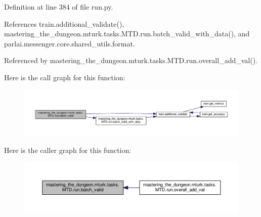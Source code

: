Definition at line 384 of file run.\+py.



References train.\+additional\+\_\+validate(), mastering\+\_\+the\+\_\+dungeon.\+mturk.\+tasks.\+M\+T\+D.\+run.\+batch\+\_\+valid\+\_\+with\+\_\+data(), and parlai.\+messenger.\+core.\+shared\+\_\+utils.\+format.



Referenced by mastering\+\_\+the\+\_\+dungeon.\+mturk.\+tasks.\+M\+T\+D.\+run.\+overall\+\_\+add\+\_\+val().

Here is the call graph for this function\+:
\nopagebreak
\begin{figure}[H]
\begin{center}
\leavevmode
\includegraphics[width=350pt]{namespacemastering__the__dungeon_1_1mturk_1_1tasks_1_1MTD_1_1run_aeb512556b4b9915ef95a15f5aaac6464_cgraph}
\end{center}
\end{figure}
Here is the caller graph for this function\+:
\nopagebreak
\begin{figure}[H]
\begin{center}
\leavevmode
\includegraphics[width=350pt]{namespacemastering__the__dungeon_1_1mturk_1_1tasks_1_1MTD_1_1run_aeb512556b4b9915ef95a15f5aaac6464_icgraph}
\end{center}
\end{figure}
\mbox{\label{namespacemastering__the__dungeon_1_1mturk_1_1tasks_1_1MTD_1_1run_a3952413e8c53e750ab43a0098c646d39}} 
